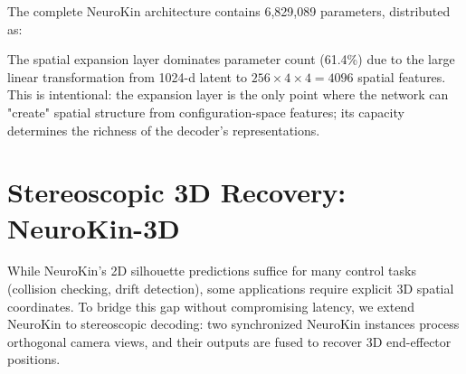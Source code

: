 ﻿\documentclass[12pt,a4paper,oneside]{report}
\begin{document}
The complete NeuroKin architecture contains 6,829,089 parameters, distributed as:

\begin{table}[H]
\centering
\caption{NeuroKin parameter distribution by component.}
\label{tab:neurokin_params}
\end{table}

The spatial expansion layer dominates parameter count (61.4\%) due to the large linear transformation from 1024-d latent to $256 \times 4 \times 4 = 4096$ spatial features. This is intentional: the expansion layer is the only point where the network can "create" spatial structure from configuration-space features; its capacity determines the richness of the decoder's representations.

\section{Stereoscopic 3D Recovery: NeuroKin-3D}

While NeuroKin's 2D silhouette predictions suffice for many control tasks (collision checking, drift detection), some applications require explicit 3D spatial coordinates. To bridge this gap without compromising latency, we extend NeuroKin to stereoscopic decoding: two synchronized NeuroKin instances process orthogonal camera views, and their outputs are fused to recover 3D end-effector positions.
\end{document}
